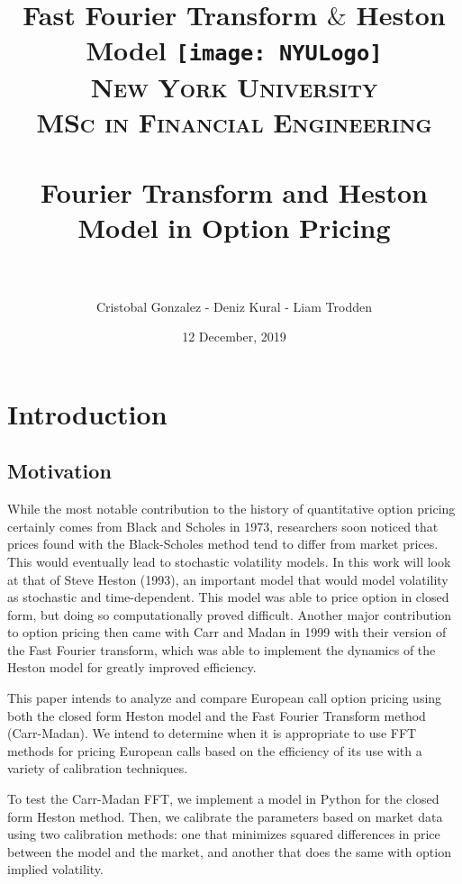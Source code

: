 \documentclass[fontsize=12pt]{article}
\title{Fast Fourier Transform $\&$ Heston Model }	%
\author{Cristobal Gonzalez - Deniz Kural - Liam Trodden}	 %
\date{\parbox{\linewidth}{\centering \today \endgraf}} %
\affil{Professor Daniel Totouom}
\title{	
\normalfont \normalsize 
 \texttt{[image: NYULogo]}\\[2.0 cm]
\textsc{\LARGE New York University} \\ [25pt] 
\textsc{MSc in Financial Engineering} \\ [25pt] 
\horrule{0.5pt} \\[0.4cm] 
\huge Fourier Transform and Heston Model in Option Pricing \\ 
\horrule{2pt} \\[2.0cm] 
}
\author{\theauthor}
\date{12 December, 2019}
\numberwithin{equation}{section} %
\numberwithin{figure}{section} %
\numberwithin{table}{section} %
\begin{document}






\maketitle


\newpage

\tableofcontents
\newpage

\section{Introduction} \label{Introduction}
 

\subsection{Motivation} \label{Motivation}

	While the most notable contribution to the history of quantitative option pricing certainly comes from Black and Scholes in 1973, researchers soon noticed that prices found with the Black-Scholes method tend to differ from market prices. This would eventually lead to stochastic volatility models. In this work will look at that of Steve Heston (1993), an important model that would model volatility as stochastic and time-dependent. This model was able to price option in closed form, but doing so computationally proved difficult. Another major contribution to option pricing then came with Carr and Madan in 1999 with their version of the Fast Fourier transform, which was able to implement the dynamics of the Heston model for greatly improved efficiency.


	This paper intends to analyze and compare European call option pricing using both the closed form Heston model and the Fast Fourier Transform method (Carr-Madan). We intend to determine when it is appropriate to use FFT methods for pricing European calls based on the efficiency of its use with a variety of calibration techniques. 


	To test the Carr-Madan FFT, we implement a model in Python for the closed form Heston method. Then, we calibrate the parameters based on market data using two calibration methods: one that minimizes squared differences in price between the model and the market, and another that does the same with option implied volatility.
\end{document}
